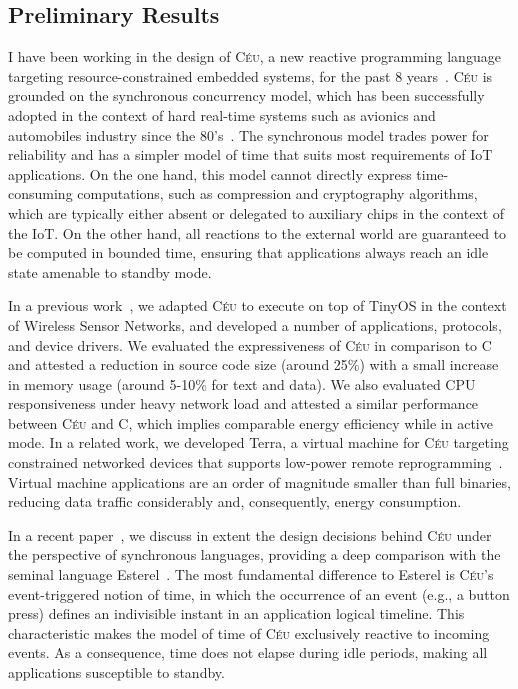 \documentclass[12pt,english]{amsart}
\newcommand{\CEU}{\textsc{C\'{e}u}\xspace}
\begin{document}
\subsection{Preliminary Results}
\label{sec.ceu}

I have been working in the design of \CEU, a new reactive programming language
targeting resource-constrained embedded systems, for the past 8
years~\cite{ceu.sensys11,ceu.tr,ceu.sensys13,ceu.rem13,ceu.phd,ceu.rebls14,
ceu.mod15,ceu.rebls15,ceu.terra,ceu.media.webmedia16,ceu.tecs17}.
%
\CEU is grounded on the synchronous concurrency model, which has been
successfully adopted in the context of hard real-time systems such as avionics
and automobiles industry since the 80's~\cite{rp.twelve}.
%
The synchronous model trades power for reliability and has a simpler model
of time that suits most requirements of IoT applications.
%
On the one hand, this model cannot directly express time-consuming
computations, such as compression and cryptography algorithms, which are
typically either absent or delegated to auxiliary chips in the context of the
IoT.
%
On the other hand, all reactions to the external world are guaranteed to be
computed in bounded
time, ensuring that applications always reach an idle state amenable to standby
mode.

In a previous work~\cite{ceu.sensys13}, we adapted \CEU to execute on top of
TinyOS in the context of Wireless Sensor Networks, and developed a number of
applications, protocols, and device drivers.
We evaluated the expressiveness of \CEU in comparison to C and attested a
reduction in source code size (around 25\%) with a small increase in memory
usage (around 5-10\% for text and data).
We also evaluated CPU responsiveness under heavy network load and attested a
similar performance between \CEU and C, which implies comparable energy
efficiency while in active mode.
%
In a related work, we developed Terra, a virtual machine for \CEU targeting
constrained networked devices that supports low-power remote
reprogramming~\cite{ceu.terra}.
Virtual machine applications are an order of magnitude smaller than full
binaries, reducing data traffic considerably and, consequently, energy
consumption.

In a recent paper~\cite{ceu.tecs17}, we discuss in extent the design decisions
behind \CEU under the perspective of
synchronous languages, providing a deep comparison with the seminal language
Esterel~\cite{esterel.ieee91}.
The most fundamental difference to Esterel is \CEU's event-triggered notion of
time, in which the occurrence of an event (e.g., a button press) defines an
indivisible instant in an application logical timeline.
This characteristic makes the model of time of \CEU exclusively reactive to
incoming events.
As a consequence, time does not elapse during idle periods, making all
applications susceptible to standby. %
\end{document}
